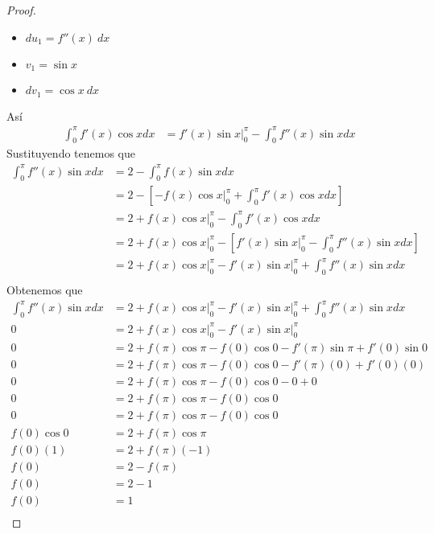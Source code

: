 \documentclass[a4paper]{article}
\begin{document}
\begin{proof}
\begin{itemize}
        \item \(du_1 = f''(x) \ dx\)
        \item \(v_1 = \sin{x}\)
        \item \(dv_1 = \cos{x} \ dx\)
    \end{itemize}
    Así
    \begin{align*}
        \int_{0}^{\pi} f'(x)\cos{x} dx &= f'(x)\sin{x} \Big|_0^\pi - \int_{0}^{\pi} f''(x)\sin{x} dx
    \end{align*}
    Sustituyendo tenemos que
    \begin{align*}
        \int_{0}^{\pi} f''(x)\sin{x} dx &= 2 - \int_{0}^{\pi} f(x)\sin{x} dx \\
                                        &= 2 - \left[ -f(x)\cos{x} \Big|_0^\pi + \int_{0}^{\pi} f'(x)\cos{x} dx \right] \\
                                        &= 2 + f(x)\cos{x} \Big|_0^\pi - \int_{0}^{\pi} f'(x)\cos{x} dx \\
                                        &= 2 + f(x)\cos{x} \Big|_0^\pi - \left[ f'(x)\sin{x}\Big|_0^\pi - \int_{0}^{\pi} f''(x)\sin{x} dx \right] \\
                                        &= 2 + f(x)\cos{x} \Big|_0^\pi - f'(x)\sin{x}\Big|_0^\pi + \int_{0}^{\pi} f''(x)\sin{x} dx \\
    \end{align*}
    Obtenemos que 
    \begin{align*}
        \int_{0}^{\pi} f''(x)\sin{x} dx &= 2 + f(x)\cos{x} \Big|_0^\pi - f'(x)\sin{x}\Big|_0^\pi + \int_{0}^{\pi} f''(x)\sin{x} dx \\
        0 &= 2 + f(x)\cos{x} \Big|_0^\pi - f'(x)\sin{x}\Big|_0^\pi \\
        0 &= 2 + f(\pi)\cos{\pi} - f(0)\cos{0} - f'(\pi)\sin{\pi} + f'(0)\sin{0} \\
        0 &= 2 + f(\pi)\cos{\pi} - f(0)\cos{0} - f'(\pi)(0) + f'(0)(0) \\
        0 &= 2 + f(\pi)\cos{\pi} - f(0)\cos{0} - 0 + 0 \\
        0 &= 2 + f(\pi)\cos{\pi} - f(0)\cos{0} \\
        0 &= 2 + f(\pi)\cos{\pi} - f(0)\cos{0} \\
        f(0)\cos{0} &= 2 + f(\pi)\cos{\pi} \\
        f(0)(1) &= 2 + f(\pi)(-1) \\
        f(0) &= 2 - f(\pi) \\
        f(0) &= 2 - 1 \\
        f(0) &= 1 \\
    \end{align*}
\end{proof}
\end{document}
